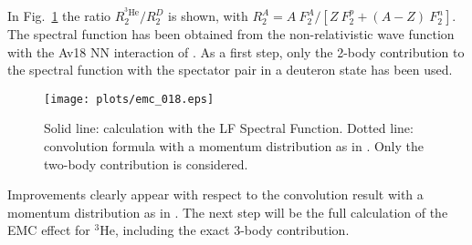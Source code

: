 { In Fig.~\ref{fig:pace} the ratio $R_2^{^3\mathrm{He}}/R_2^D$ is shown, with $R_2^A = A~ F_2^A/[Z ~F_2^p + (A-Z)~F_2^n]$.
The  spectral function has been obtained from the non-relativistic wave function  with the Av18 NN interaction of \cite{Kievsky:1997bg}. As a first step, only
the 2-body contribution 
to the spectral function with the spectator pair  in a {{deuteron state}}
has been used.
 \begin{figure}
\centerline{\texttt{[image: plots/emc\_018.eps]}}
 \caption{Solid line: calculation with the {{LF Spectral Function}}. 
\label{fig:pace}
Dotted line: {convolution formula  with a momentum distribution as in \cite{Oelfke:1990uy}}. Only  the two-body contribution is considered.}
 \end{figure}
{{Improvements clearly appear with respect to the
convolution result with a momentum distribution as in \cite{Oelfke:1990uy}}.
The next step will be the full calculation of the EMC effect for $^3\mathrm{He}$, including the exact
3-body contribution. 
}}



